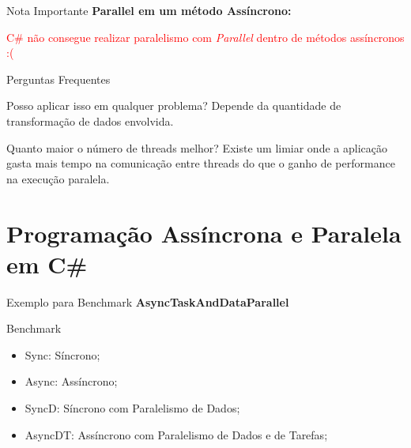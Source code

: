 \documentclass[10pt]{beamer}
\begin{document}
\begin{frame}{Nota Importante}
	\textbf{Parallel em um método Assíncrono:} 
	\vspace{0.3cm}
	
	\textcolor{red}{C\# não consegue realizar paralelismo com \textit{Parallel} dentro de métodos assíncronos :(}
\end{frame}

\begin{frame}{Perguntas Frequentes}
	\begin{exampleblock}{Posso aplicar isso em qualquer problema?}
		Depende da quantidade de transformação de dados envolvida.
	\end{exampleblock}
	\vspace{0.2cm}
	\begin{exampleblock}{Quanto maior o número de threads melhor?}
		Existe um limiar onde a aplicação gasta mais tempo na comunicação entre threads do que o ganho de performance na execução paralela.
	\end{exampleblock}
\end{frame}

\section{Programação Assíncrona e Paralela em C\#}

\begin{frame}{Exemplo para Benchmark}
	\textbf{AsyncTaskAndDataParallel}
\end{frame}

\begin{frame}{Benchmark}
	\begin{figure}
	\end{figure}
	\vspace{-0.5cm}
	\scriptsize
	\begin{itemize}
		\item Sync: Síncrono;
		\item Async: Assíncrono;
		\item SyncD: Síncrono com Paralelismo de Dados;
		\item AsyncDT: Assíncrono com Paralelismo de Dados e de Tarefas;
	\end{itemize}
\end{frame}
\end{document}
